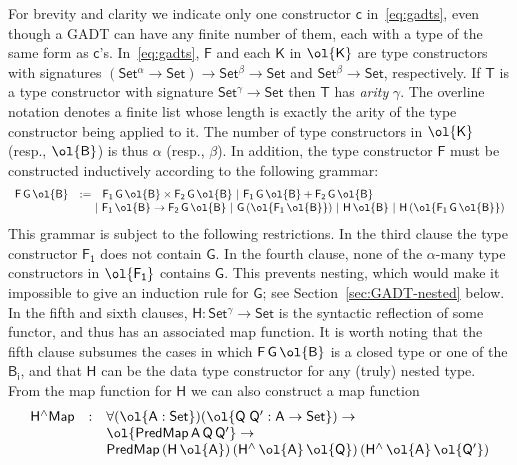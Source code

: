 \documentclass[sigplan,10pt]{acmart}
\begin{document}
\noindent
For brevity and clarity we indicate only one constructor $\mathsf{c}$
in~\eqref{eq:gadts}, even though a GADT can have any finite number of
them, each with a type of the same form as
$\mathsf{c}$'s. In~\eqref{eq:gadts}, $\mathsf{F}$ and each
$\mathsf{K}$ in $\ol{\mathsf{K}}$ are type constructors with
signatures $\mathsf{(Set^{\alpha} \to Set) \to Set^{\beta} \to Set}$
and $\mathsf{Set^{\beta} \to Set}$, respectively. If $\mathsf{T}$ is a
type constructor with signature $\mathsf{Set^{\gamma} \to Set}$ then
$\mathsf{T}$ has {\em arity} $\mathsf{\gamma}$.  The
overline notation denotes a finite list whose length is exactly the
arity of the type constructor being applied to it. The number of type
constructors in $\ol{\mathsf{K}}$ (resp., $\ol{\mathsf{B}}$) is thus
$\alpha$ (resp., $\beta$). In addition, the type constructor
$\mathsf{F}$ must be constructed inductively according to the
following grammar:\label{grammar}
\[\begin{array}{lll}
\mathsf{F\,G\,\ol{B}} & := &
\mathsf{F_1\,G\,\ol{B} \times F_2\,G\,\ol{B} \ \vert\ F_1\,G\,\ol{B} +
  F_2\,G\,\ol{B}}\\
& & \!\!\!\!\mathsf{\vert\ F_1\,\ol{B} \to F_2\,G\,\ol{B}
\ \vert\ G\,(\ol{F_1\,\ol{B}}) \ \vert\ H\,\ol{B} \ \vert\ H\,
(\ol{F_1\,G\,\ol{B}}) }
\end{array}\]
This grammar is subject to the following restrictions. In the third
clause the type constructor $\mathsf{F_1}$ does not contain
$\mathsf{G}$. In the fourth clause, none of the $\mathsf{\alpha}$-many
type constructors in $\mathsf{\ol{F_1}}$ contains $\mathsf{G}$. This
prevents nesting, which would make it impossible to give an induction
rule for $\mathsf{G}$; see Section~\ref{sec:GADT-nested} below. In the
fifth and sixth clauses, $\mathsf{H : Set^\gamma \to Set}$ is the
syntactic reflection of some functor, and thus has an associated map
function. It is worth noting that the fifth clause subsumes the cases
in which $\mathsf{F\,G\,\ol{B}}$ is a closed type or one of the
$\mathsf{B_i}$, and that $\mathsf{H}$ can be the data type constructor
for any (truly) nested type. From the map function for $\mathsf{H}$ we
can also construct a map function
\begin{equation}\label{eq:hliftmap}
\begin{array}{lll}
\mathsf{H^\wedge Map} & : & \mathsf{\forall (\ol{A : Set}) (\ol{Q\;Q'
    : A \to Set}) \to}\\
& & \mathsf{\ol{PredMap\,A\,Q\,Q'} \to}\\
& & \mathsf{PredMap\,(H\,\ol{A})\,(H^{\wedge}\,\ol{A}\,\ol{Q})\, 
(H^{\wedge}\,\ol{A}\,\ol{Q'})}
\end{array}
\end{equation}
\end{document}
